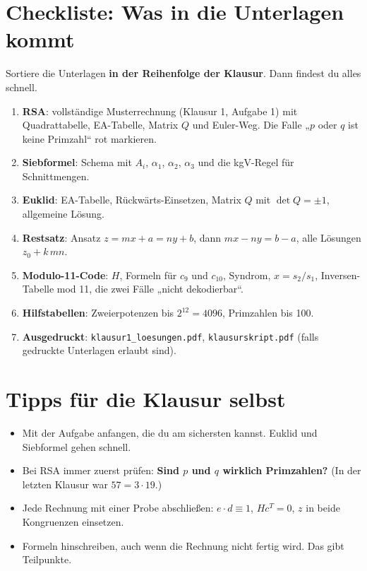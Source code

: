 \section*{Checkliste: Was in die Unterlagen kommt}
Sortiere die Unterlagen \textbf{in der Reihenfolge der Klausur}. Dann findest du alles schnell.
\begin{enumerate}
\item[\cb] \textbf{RSA}: vollständige Musterrechnung (Klausur 1, Aufgabe 1) mit Quadrattabelle, EA-Tabelle, Matrix $Q$ und Euler-Weg.
      Die Falle „$p$ oder $q$ ist keine Primzahl“ rot markieren.
\item[\cb] \textbf{Siebformel}: Schema mit $A_i$, $\alpha_1$, $\alpha_2$, $\alpha_3$ und die kgV-Regel für Schnittmengen.
\item[\cb] \textbf{Euklid}: EA-Tabelle, Rückwärts-Einsetzen, Matrix $Q$ mit $\det Q = \pm 1$, allgemeine Lösung.
\item[\cb] \textbf{Restsatz}: Ansatz $z = mx + a = ny + b$, dann $mx - ny = b - a$, alle Lösungen $z_0 + k\,mn$.
\item[\cb] \textbf{Modulo-11-Code}: $H$, Formeln für $c_9$ und $c_{10}$, Syndrom, $x = s_2/s_1$, Inversen-Tabelle mod 11,
      die zwei Fälle „nicht dekodierbar“.
\item[\cb] \textbf{Hilfstabellen}: Zweierpotenzen bis $2^{12} = 4096$, Primzahlen bis 100.
\item[\cb] \textbf{Ausgedruckt}: \texttt{klausur1\_loesungen.pdf}, \texttt{klausurskript.pdf} (falls gedruckte Unterlagen erlaubt sind).
\end{enumerate}

\section*{Tipps für die Klausur selbst}
\begin{itemize}
\item Mit der Aufgabe anfangen, die du am sichersten kannst. Euklid und Siebformel gehen schnell.
\item Bei RSA immer zuerst prüfen: \textbf{Sind $p$ und $q$ wirklich Primzahlen?} (In der letzten Klausur war $57 = 3 \cdot 19$.)
\item Jede Rechnung mit einer Probe abschließen: $e \cdot d \equiv 1$, $H c^T = 0$, $z$ in beide Kongruenzen einsetzen.
\item Formeln hinschreiben, auch wenn die Rechnung nicht fertig wird. Das gibt Teilpunkte.
\end{itemize}


